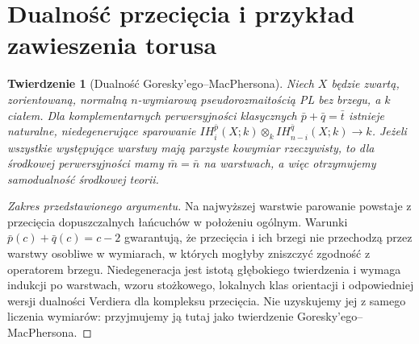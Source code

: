 \documentclass[11pt,a4paper,oneside]{report}
\theoremstyle{plain}
\newtheorem{twierdzenie}{Twierdzenie}[section]
\theoremstyle{definition}
\theoremstyle{remark}
\begin{document}
\section{Dualność przecięcia i przykład zawieszenia torusa}
\begin{twierdzenie}[Dualność Goresky'ego--MacPhersona]
\label{thm:ih-duality-xiii}
Niech $X$ będzie zwartą, zorientowaną, normalną
$n$-wymiarową pseudorozmaitością PL bez brzegu,
a $k$ ciałem. Dla komplementarnych perwersyjności
klasycznych $\bar p+\bar q=\bar t$ istnieje
naturalne, niedegenerujące sparowanie
$IH_i^{\bar p}(X;k)\otimes_k
 IH_{n-i}^{\bar q}(X;k)\to k$.
Jeżeli wszystkie występujące warstwy mają parzyste
kowymiar rzeczywisty, to dla środkowej
perwersyjności mamy $\bar m=\bar n$ na warstwach,
a więc otrzymujemy samodualność środkowej teorii.
\end{twierdzenie}
\begin{proof}[Zakres przedstawionego argumentu]
Na najwyższej warstwie parowanie powstaje z przecięcia
dopuszczalnych łańcuchów w położeniu ogólnym.
Warunki $\bar p(c)+\bar q(c)=c-2$ gwarantują,
że przecięcia i ich brzegi nie przechodzą przez
warstwy osobliwe w wymiarach, w których mogłyby
zniszczyć zgodność z operatorem brzegu.
Niedegeneracja jest istotą głębokiego twierdzenia
i wymaga indukcji po warstwach, wzoru stożkowego,
lokalnych klas orientacji i odpowiedniej wersji
dualności Verdiera dla kompleksu przecięcia.
Nie uzyskujemy jej z samego liczenia wymiarów:
przyjmujemy ją tutaj jako twierdzenie Goresky'ego--MacPhersona.
\end{proof}
\end{document}
